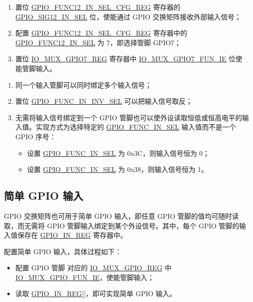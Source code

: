 \documentclass[main\_\_CN.tex]{subfiles}
\begin{document}
\begin{enumerate}
\item 置位 \hyperref[regdesc:GPIOFUNCNINSELCFGREG]{GPIO\_FUNC12\_IN\_SEL\_CFG\_REG} 寄存器的 \hyperref[fielddesc:GPIOSIGNINSEL]{GPIO\_SIG12\_IN\_SEL} 位，使能通过 GPIO 交换矩阵接收外部输入信号；
\item 配置 \hyperref[regdesc:GPIOFUNCNINSELCFGREG]{GPIO\_FUNC12\_IN\_SEL\_CFG\_REG} 寄存器中的 \hyperref[fielddesc:GPIOFUNCNINSEL]{GPIO\_FUNC12\_IN\_SEL} 为 7，即选择管脚 GPIO7；
\item 置位 \hyperref[regdesc:IOMUXGPIONREG]{IO\_MUX\_GPIO7\_REG} 寄存器中 \hyperref[fielddesc:IOMUXGPIONFUNIE]{IO\_MUX\_GPIO7\_FUN\_IE} 位使能管脚输入。
\end{enumerate}

\begin{tiplisting}
\vspace{-2em}
\begin{enumerate}
\item \label{input-note-1} 同一个输入管脚可以同时绑定多个输入信号；
\item \label{input-note-2} 置位 \hyperref[fielddesc:GPIOFUNCNININVSEL]{GPIO\_FUNC\_IN\_INV\_SEL} 可以把输入信号取反；
\item \label{input-note-3}无需将输入信号绑定到一个 GPIO 管脚也可以使外设读取恒低或恒高电平的输入值。实现方式为选择特定的 \hyperref[fielddesc:GPIOFUNCNINSEL]{GPIO\_FUNC\_IN\_SEL} 输入值而不是一个 GPIO 序号：
\begin {itemize}
\item 设置 \hyperref[fielddesc:GPIOFUNCNINSEL]{GPIO\_FUNC\_IN\_SEL} 为 0x3C，则输入信号恒为 0；
\item 设置 \hyperref[fielddesc:GPIOFUNCNINSEL]{GPIO\_FUNC\_IN\_SEL} 为 0x38，则输入信号恒为 1。
\end{itemize}
\end{enumerate}
\end{tiplisting}

\subsection{简单 GPIO 输入}\label{IOMUXSimpleGPIOInput}

GPIO 交换矩阵也可用于简单 GPIO 输入，即任意 GPIO 管脚的值均可随时读取，而无需将 GPIO 管脚输入绑定到某个外设信号。其中，每个 GPIO 管脚的输入值保存在 \hyperref[regdesc:GPIOINREG]{GPIO\_IN\_REG} 寄存器中。

配置简单 GPIO 输入，具体过程如下：
\begin{itemize}
    \item 配置 GPIO 管脚  对应的 \hyperref[regdesc:IOMUXGPIONREG]{IO\_MUX\_GPIO\_REG} 中 \hyperref[fielddesc:IOMUXGPIONFUNIE]{IO\_MUX\_GPIO\_FUN\_IE}，使能管脚输入；
    \item 读取 \hyperref[regdesc:GPIOINREG]{GPIO\_IN\_REG[]}，即可实现简单 GPIO 输入。
\end{itemize}
\end{document}
